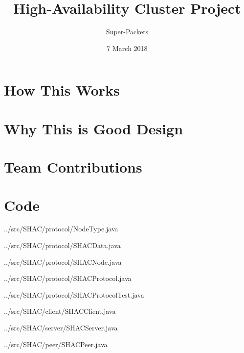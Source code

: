 \documentclass[11pt]{article}
\title{High-Availability Cluster Project}
\author{Super-Packets}
\date{7 March 2018}
\begin{document}
\maketitle

\thispagestyle{empty}

\begin{doublespace}
  \section{How This Works}

  \section{Why This is Good Design}

  \section{Team Contributions}

  \section{Code}
\end{doublespace}
\begin{tiny}

\begin{lstinputlisting}[language=Java]{../src/SHAC/protocol/NodeType.java}
\end{lstinputlisting}
\begin{lstinputlisting}[language=Java]{../src/SHAC/protocol/SHACData.java}
\end{lstinputlisting}
\begin{lstinputlisting}[language=Java]{../src/SHAC/protocol/SHACNode.java}
\end{lstinputlisting}
\begin{lstinputlisting}[language=Java]{../src/SHAC/protocol/SHACProtocol.java}
\end{lstinputlisting}
\begin{lstinputlisting}[language=Java]{../src/SHAC/protocol/SHACProtocolTest.java}
\end{lstinputlisting}
\begin{lstinputlisting}[language=Java]{../src/SHAC/client/SHACClient.java}
\end{lstinputlisting}
\begin{lstinputlisting}[language=Java]{../src/SHAC/server/SHACServer.java}
\end{lstinputlisting}
\begin{lstinputlisting}[language=Java]{../src/SHAC/peer/SHACPeer.java}
\end{lstinputlisting}

\end{tiny}
\end{document}
